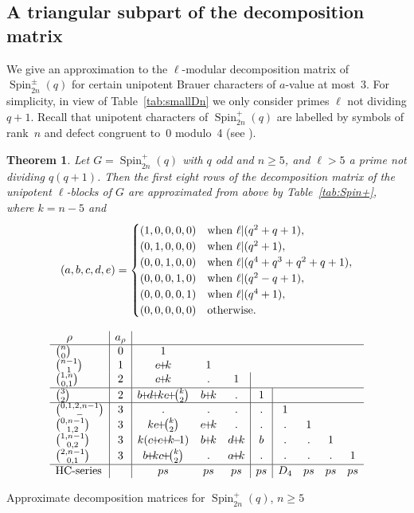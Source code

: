 \documentclass[12pt,leqno,a4paper]{amsart}
\newcommand{\Spin}{{\operatorname{Spin}}}
\newcommand{\pl}{{\!+\!}}
\newcommand{\mn}{{\!-\!}}
\newtheorem{thm}{Theorem}[section]
\theoremstyle{remark}
\begin{document}
\subsection{A triangular subpart of the decomposition matrix}
We give an approximation to the $\ell$-modular decomposition matrix of
$\Spin_{2n}^\pm(q)$ for certain unipotent Brauer characters of $a$-value at
most~3. For simplicity, in view of Table~\ref{tab:smallDn} we only consider
primes $\ell$ not dividing $q+1$.
Recall that unipotent characters of $\Spin_{2n}^+(q)$ are labelled by symbols
of rank~$n$ and defect congruent to~0 modulo~4 (see \cite[\S13.8]{Ca}).

\begin{thm}   \label{thm:decD+}
 Let $G=\Spin_{2n}^+(q)$ with $q$ odd and $n\ge5$, and $\ell>5$ a prime not
 dividing $q(q+1)$. Then the first eight rows of the decomposition matrix of
 the unipotent $\ell$-blocks of $G$ are approximated from above by
 Table~\ref{tab:Spin+}, where $k=n-5$ and
 $$(a,b,c,d,e)=\begin{cases}
                         (1,0,0,0,0)& \text{when $\ell|(q^2+q+1)$},\cr
                         (0,1,0,0,0)& \text{when $\ell|(q^2+1)$},\cr
                         (0,0,1,0,0)& \text{when $\ell|(q^4+q^3+q^2+q+1)$},\cr
                         (0,0,0,1,0)& \text{when $\ell|(q^2-q+1)$},\cr
                         (0,0,0,0,1)& \text{when $\ell|(q^4+1)$},\cr
                         (0,0,0,0,0)& \text{otherwise}.\cr
 \end{cases}$$
\end{thm}

\begin{table}[ht]
{\small\[\begin{array}{l|c|ccc|c|cccc}
  \quad\rho& a_\rho\cr
 \hline
        \binom{n}{0}& 0& 1\cr
      \binom{n-1}{1}& 1& e\pl k& 1\cr
    \binom{1,n}{0,1}& 2& c\pl k& .& 1\cr
 \hline
        \binom{3}{2}& 2& b\pl d\pl ke\pl\binom{k}{2}& b\pl k& .&  1\cr
 \hline
\binom{0,1,2,n-1}{-}& 3& .& .& .&  .& 1\cr
  \binom{0,n-1}{1,2}& 3& ke\pl\binom{k}{2}& e\pl k& .&  .& .& 1\cr
  \binom{1,n-1}{0,2}& 3& k(c\pl e\pl k\mn1)& b \pl k& d\pl k& b& .& .& 1\cr
  \binom{2,n-1}{0,1}& 3& b\pl kc\pl\binom{k}{2}& .& a\pl k& .& .& .& .& 1\cr
 \hline
 \text{HC-series}& & ps& ps& ps& ps& D_4& ps& ps& ps\cr
\end{array}\]}
\caption{Approximate decomposition matrices for $\Spin_{2n}^+(q)$, $n\ge5$}   \label {tab:Spin+}
\end{table}
\end{document}
